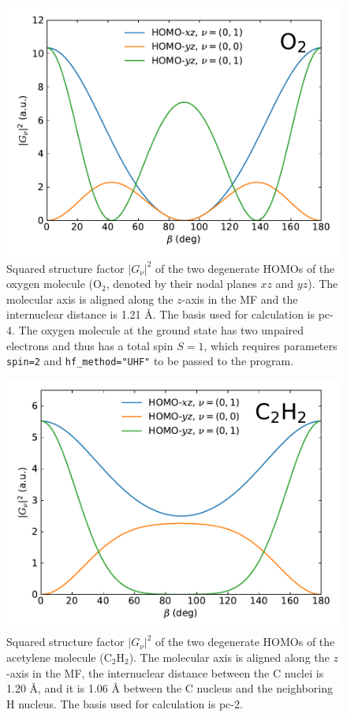 \documentclass[preprint,12pt]{elsarticle} %
\renewcommand{\rm}[1]{\mathrm{#1}}    %
\newcommand{\abs}[1]{\lvert #1 \rvert}  %
\begin{document}
\begin{figure}
    \centering
    \includegraphics[width=\columnwidth]{O2_Example_sub_20230225.pdf}
    \caption{Squared structure factor $\abs{G_\nu}^2$ of the two degenerate HOMOs of the oxygen molecule ($\rm{O}_2$, denoted by their nodal planes $xz$ and $yz$). The molecular axis is aligned along the $z$-axis in the MF and the internuclear distance is 1.21 \r{A}. The basis used for calculation is pc-4. The oxygen molecule at the ground state has two unpaired electrons and thus has a total spin $S=1$, which requires parameters \texttt{spin=2} and \texttt{hf\_method="UHF"} to be passed to the program.}
    \label{fig:example_O2}
\end{figure}

\begin{figure}
    \centering
    \includegraphics[width=\columnwidth]{C2H2_Example_sub_20230225.pdf}
    \caption{Squared structure factor $\abs{G_\nu}^2$ of the two degenerate HOMOs of the acetylene molecule ($\rm{C}_2 \rm{H}_2$). The molecular axis is aligned along the $z$-axis in the MF, the internuclear distance between the C nuclei is 1.20 \r{A}, and it is 1.06 \r{A} between the C nucleus and the neighboring H nucleus. The basis used for calculation is pc-2.}
    \label{fig:example_C2H2}
\end{figure}
\end{document}
